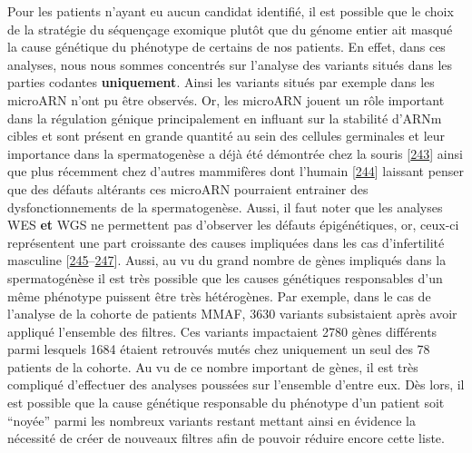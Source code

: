 \documentclass[12pt,a4paper,twoside]{ugathesis}
\theoremstyle{definition}
\theoremstyle{definition}
\theoremstyle{definition}
\theoremstyle{remark}
\begin{document}
Pour les patients n'ayant eu aucun candidat identifié, il est possible
que le choix de la stratégie du séquençage exomique plutôt que du génome
entier ait masqué la cause génétique du phénotype de certains de nos
patients. En effet, dans ces analyses, nous nous sommes concentrés sur
l'analyse des variants situés dans les parties codantes
\textbf{uniquement}. Ainsi les variants situés par exemple dans les
microARN n'ont pu être observés. Or, les microARN jouent un rôle
important dans la régulation génique principalement en influant sur la
stabilité d'ARNm cibles et sont présent en grande quantité au sein des
cellules germinales et leur importance dans la spermatogenèse a déjà été
démontrée chez la souris
{[}\protect\hyperlink{ref-Comazzetto2014}{243}{]} ainsi que plus
récemment chez d'autres mammifères dont l'humain
{[}\protect\hyperlink{ref-Chen2017}{244}{]} laissant penser que des
défauts altérants ces microARN pourraient entrainer des
dysfonctionnements de la spermatogenèse. Aussi, il faut noter que les
analyses WES \textbf{et} WGS ne permettent pas d'observer les défauts
épigénétiques, or, ceux-ci représentent une part croissante des causes
impliquées dans les cas d'infertilité masculine
{[}\protect\hyperlink{ref-Carrell2011}{245}--\protect\hyperlink{ref-Dada2012}{247}{]}.
Aussi, au vu du grand nombre de gènes impliqués dans la spermatogénèse
il est très possible que les causes génétiques responsables d'un même
phénotype puissent être très hétérogènes. Par exemple, dans le cas de
l'analyse de la cohorte de patients MMAF, 3630 variants subsistaient
après avoir appliqué l'ensemble des filtres. Ces variants impactaient
2780 gènes différents parmi lesquels 1684 étaient retrouvés mutés chez
uniquement un seul des 78 patients de la cohorte. Au vu de ce nombre
important de gènes, il est très compliqué d'effectuer des analyses
poussées sur l'ensemble d'entre eux. Dès lors, il est possible que la
cause génétique responsable du phénotype d'un patient soit ``noyée''
parmi les nombreux variants restant mettant ainsi en évidence la
nécessité de créer de nouveaux filtres afin de pouvoir réduire encore
cette liste.
\end{document}
